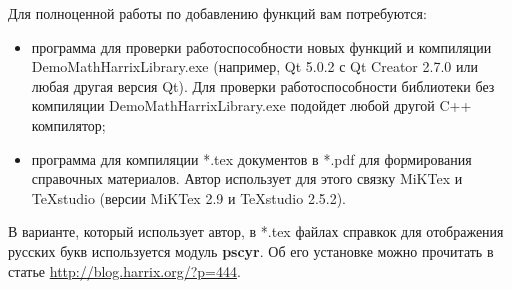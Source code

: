 Для полноценной работы по добавлению функций вам потребуются:
\begin{itemize}
\item программа для проверки работоспособности новых функций и компиляции DemoMathHarrixLibrary.exe (например, Qt 5.0.2 с Qt Creator 2.7.0 или любая другая версия Qt). Для проверки работоспособности библиотеки без компиляции DemoMathHarrixLibrary.exe подойдет любой другой C++ компилятор;
\item программа для компиляции *.tex документов в *.pdf для формирования справочных материалов. Автор использует для этого связку MiKTex и TeXstudio (версии MiKTex 2.9 и TeXstudio 2.5.2).
\end{itemize}

В варианте, который использует автор, в *.tex файлах справкок для отображения русских букв используется модуль \textbf{pscyr}. Об его установке можно прочитать в статье \href{http://blog.harrix.org/?p=444}{http://blog.harrix.org/?p=444}.

